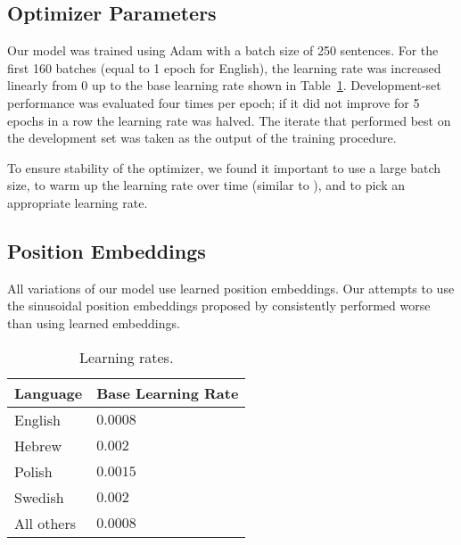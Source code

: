 \documentclass[11pt,a4paper]{article}
\begin{document}
\subsection{Optimizer Parameters}

Our model was trained using Adam with a batch size of 250 sentences. For the first 160 batches (equal to 1 epoch for English), the learning rate was increased linearly from $0$ up to the base learning rate shown in Table~\ref{table:lr}. Development-set performance was evaluated four times per epoch; if it did not improve for 5 epochs in a row the learning rate was halved. The iterate that performed best on the development set was taken as the output of the training procedure.

To ensure stability of the optimizer, we found it important to use a large batch size, to warm up the learning rate over time (similar to \citet{vaswani_attention_2017}), and to pick an appropriate learning rate.

\subsection{Position Embeddings}

All variations of our model use learned position embeddings. Our attempts to use the sinusoidal position embeddings proposed by \citet{vaswani_attention_2017} consistently performed worse than using learned embeddings.

\begin{table}
\begin{center}
\begin{tabular}{@{}ll@{}}
\toprule
Language & Base Learning Rate \\
\midrule
English & $0.0008$ \\
Hebrew & $0.002$ \\
Polish & $0.0015$ \\
Swedish & $0.002$ \\
All others & $0.0008$ \\
\bottomrule
\end{tabular}
\end{center}
\caption{
\label{table:lr}
Learning rates.
}
\end{table}
\end{document}
